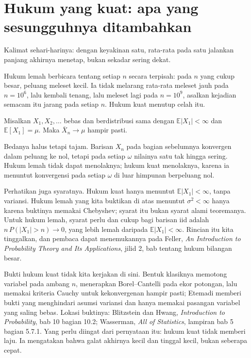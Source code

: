 \section{Hukum yang kuat: apa yang sesungguhnya ditambahkan}

Kalimat sehari-harinya: dengan keyakinan satu, rata-rata pada satu jalankan
panjang akhirnya menetap, bukan sekadar sering dekat.

Hukum lemah berbicara tentang setiap $n$ secara terpisah: pada $n$ yang cukup
besar, peluang meleset kecil. Ia tidak melarang rata-rata meleset jauh pada
$n=10^6$, lalu kembali tenang, lalu meleset lagi pada $n=10^9$, asalkan kejadian
semacam itu jarang pada setiap $n$. Hukum kuat menutup celah itu.

\begin{teorema}
Misalkan $X_1,X_2,\dots$ bebas dan berdistribusi sama dengan
$\mathbb{E}|X_1|<\infty$ dan $\mathbb{E}[X_1]=\mu$. Maka
$\bar X_n\to\mu$ hampir pasti.
\end{teorema}

Bedanya halus tetapi tajam. Barisan $X_n$ pada bagian sebelumnya konvergen dalam
peluang ke nol, tetapi pada setiap $\omega$ nilainya satu tak hingga sering.
Hukum lemah tidak dapat menolaknya; hukum kuat menolaknya, karena ia menuntut
konvergensi pada setiap $\omega$ di luar himpunan berpeluang nol.

Perhatikan juga syaratnya. Hukum kuat hanya menuntut $\mathbb{E}|X_1|<\infty$,
tanpa variansi. Hukum lemah yang kita buktikan di atas menuntut $\sigma^2<\infty$
hanya karena buktinya memakai Chebyshev; syarat itu bukan syarat alami teoremanya.
Untuk hukum lemah, syarat perlu dan cukup bagi barisan iid adalah
$n\,P(|X_1|>n)\to0$, yang lebih lemah daripada $\mathbb{E}|X_1|<\infty$. Rincian
itu kita tinggalkan, dan pembaca dapat menemukannya pada Feller, \emph{An
Introduction to Probability Theory and Its Applications}, jilid 2, bab tentang
hukum bilangan besar.

Bukti hukum kuat tidak kita kerjakan di sini. Bentuk klasiknya memotong variabel
pada ambang $n$, menerapkan Borel--Cantelli pada ekor potongan, lalu memakai
kriteria Cauchy untuk kekonvergenan hampir pasti; Etemadi memberi bukti yang
menghindari asumsi variansi dan hanya memakai pasangan variabel yang saling
bebas. Lokasi buktinya: Blitzstein dan Hwang, \emph{Introduction to Probability},
bab 10 bagian 10.2; Wasserman, \emph{All of Statistics}, lampiran bab 5 bagian
5.7.1. Yang perlu diingat dari pernyataan itu: hukum kuat tidak memberi laju.
Ia mengatakan bahwa galat akhirnya kecil dan tinggal kecil, bukan seberapa cepat.

